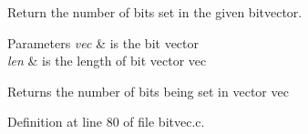 Return the number of bits set in the given bitvector. 


\begin{DoxyParams}{Parameters}
{\em vec} & is the bit vector \\
\hline
{\em len} & is the length of bit vector {\ttfamily vec} \\
\hline
\end{DoxyParams}
\begin{DoxyReturn}{Returns}
the number of bits being set in vector {\ttfamily vec} 
\end{DoxyReturn}


Definition at line 80 of file bitvec.\+c.

